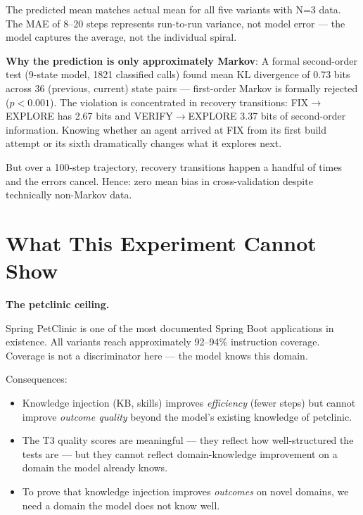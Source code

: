 \documentclass[11pt,a4paper]{article}
\begin{document}
The predicted mean matches actual mean for all five variants with N=3 data.
The MAE of 8--20 steps represents run-to-run variance, not model error ---
the model captures the average, not the individual spiral.

\textbf{Why the prediction is only approximately Markov}:
A formal second-order test (9-state model, 1821 classified calls) found mean KL
divergence of 0.73 bits across 36 (previous, current) state pairs ---
first-order Markov is formally rejected ($p < 0.001$).
The violation is concentrated in recovery transitions:
FIX$\to$EXPLORE has 2.67 bits and VERIFY$\to$EXPLORE 3.37 bits of second-order information.
Knowing whether an agent arrived at FIX from its first build attempt or its
sixth dramatically changes what it explores next.

But over a 100-step trajectory, recovery transitions happen a handful of times
and the errors cancel. Hence: zero mean bias in cross-validation despite
technically non-Markov data.

\section{What This Experiment Cannot Show}
\label{sec:limits}

\begin{warningbox}
\textbf{The petclinic ceiling.}

Spring PetClinic is one of the most documented Spring Boot applications in existence.
All variants reach approximately 92--94\% instruction coverage.
Coverage is not a discriminator here --- the model knows this domain.

Consequences:
\begin{itemize}
  \item Knowledge injection (KB, skills) improves \emph{efficiency} (fewer steps) but
        cannot improve \emph{outcome quality} beyond the model's existing knowledge of petclinic.
  \item The T3 quality scores are meaningful --- they reflect how well-structured
        the tests are --- but they cannot reflect domain-knowledge improvement
        on a domain the model already knows.
  \item To prove that knowledge injection improves \emph{outcomes} on novel domains,
        we need a domain the model does not know well.
\end{itemize}
\end{warningbox}
\end{document}
